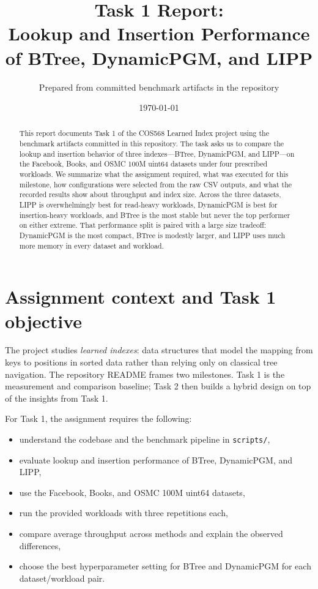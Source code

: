 \documentclass[11pt]{article}
\title{Task 1 Report:\\Lookup and Insertion Performance of BTree, DynamicPGM, and LIPP}
\author{Prepared from committed benchmark artifacts in the repository}
\date{\today}
\begin{document}
\maketitle

\begin{abstract}
This report documents Task 1 of the COS568 Learned Index project using the benchmark
artifacts committed in this repository. The task asks us to compare the lookup and
insertion behavior of three indexes---BTree, DynamicPGM, and LIPP---on the Facebook,
Books, and OSMC 100M uint64 datasets under four prescribed workloads. We summarize what
the assignment required, what was executed for this milestone, how configurations were
selected from the raw CSV outputs, and what the recorded results show about throughput
and index size. Across the three datasets, LIPP is overwhelmingly best for read-heavy
workloads, DynamicPGM is best for insertion-heavy workloads, and BTree is the most
stable but never the top performer on either extreme. That performance split is paired
with a large size tradeoff: DynamicPGM is the most compact, BTree is modestly larger,
and LIPP uses much more memory in every dataset and workload.
\end{abstract}

\section{Assignment context and Task 1 objective}

The project studies \emph{learned indexes}: data structures that model the mapping from
keys to positions in sorted data rather than relying only on classical tree navigation.
The repository README frames two milestones. Task 1 is the measurement and comparison
baseline; Task 2 then builds a hybrid design on top of the insights from Task 1.

For Task 1, the assignment requires the following:
\begin{itemize}[leftmargin=1.5em]
    \item understand the codebase and the benchmark pipeline in \texttt{scripts/},
    \item evaluate lookup and insertion performance of BTree, DynamicPGM, and LIPP,
    \item use the Facebook, Books, and OSMC 100M uint64 datasets,
    \item run the provided workloads with three repetitions each,
    \item compare average throughput across methods and explain the observed differences,
    \item choose the best hyperparameter setting for BTree and DynamicPGM for each
    dataset/workload pair.
\end{itemize}
\end{document}
